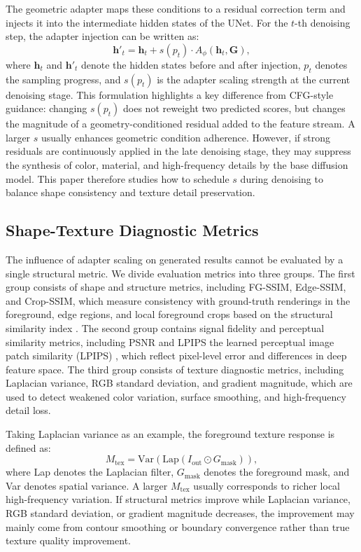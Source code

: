 \documentclass[times,twocolumn,final]{elsarticle}
\providecommand{\DIFadd}[1]{{\protect\color{blue} \sf #1}} %
\providecommand{\DIFdel}[1]{{\protect\color{red} \scriptsize #1}} %
\providecommand{\DIFaddbegin}{} %
\providecommand{\DIFaddend}{} %
\providecommand{\DIFdelbegin}{} %
\providecommand{\DIFdelend}{} %
\newcommand{\DIFscaledelfig}{0.5}
\newlength{\DIFdelgraphicswidth} %
\newlength{\DIFdelgraphicsheight} %
\newcommand{\DIFaddincludegraphics}[2][]{{\color{blue}\fbox{\DIFOincludegraphics[#1]{#2}}}} %
\newcommand{\DIFdelincludegraphics}[2][]{%
\sbox{\DIFdelgraphicsbox}{\DIFOincludegraphics[#1]{#2}}%
\settoboxwidth{\DIFdelgraphicswidth}{\DIFdelgraphicsbox} %
\settoboxtotalheight{\DIFdelgraphicsheight}{\DIFdelgraphicsbox} %
\scalebox{\DIFscaledelfig}{%
\parbox[b]{\DIFdelgraphicswidth}{\usebox{\DIFdelgraphicsbox}\\[-\baselineskip] \rule{\DIFdelgraphicswidth}{0em}}\llap{\resizebox{\DIFdelgraphicswidth}{\DIFdelgraphicsheight}{%
\setlength{\unitlength}{\DIFdelgraphicswidth}%
\begin{picture}(1,1)%
\thicklines\linethickness{2pt} %
{\color[rgb]{1,0,0}\put(0,0){\framebox(1,1){}}}%
{\color[rgb]{1,0,0}\put(0,0){\line( 1,1){1}}}%
{\color[rgb]{1,0,0}\put(0,1){\line(1,-1){1}}}%
\end{picture}%
}\hspace*{3pt}}} %
} %
\DeclareRobustCommand{\DIFaddbegin}{\DIFOaddbegin \let\includegraphics\DIFaddincludegraphics} %
\DeclareRobustCommand{\DIFaddend}{\DIFOaddend \let\includegraphics\DIFOincludegraphics} %
\DeclareRobustCommand{\DIFdelbegin}{\DIFOdelbegin \let\includegraphics\DIFdelincludegraphics} %
\DeclareRobustCommand{\DIFdelend}{\DIFOaddend \let\includegraphics\DIFOincludegraphics} %
\begin{document}
The geometric adapter maps these conditions to a residual correction term and injects it into the intermediate hidden states of the UNet. For the $t$-th denoising step, the adapter injection can be written as:
\begin{equation}
\mathbf{h}'_t = \mathbf{h}_t + s(p_t) \cdot A_\phi(\mathbf{h}_t, \mathbf{G}),
\label{eq:injection}
\end{equation}
where $\mathbf{h}_t$ and $\mathbf{h}'_t$ denote the hidden states before and after injection, $p_t$ denotes the sampling progress, and $s(p_t)$ is the adapter scaling strength at the current denoising stage. This formulation highlights a key difference from CFG-style guidance: changing $s(p_t)$ does not reweight two predicted scores, but changes the magnitude of a geometry-conditioned residual added to the feature stream. A larger $s$ usually enhances geometric condition adherence. However, if strong residuals are continuously applied in the late denoising stage, they may suppress the synthesis of color, material, and high-frequency details by the base diffusion model. This paper therefore studies how to schedule $s$ during denoising to balance shape consistency and texture detail preservation.

\subsection{Shape-Texture Diagnostic Metrics}
\label{subsec:metrics}

The influence of adapter scaling on generated results cannot be evaluated by a single structural metric. We divide evaluation metrics into three groups. The first group consists of shape and structure metrics, including FG-SSIM, Edge-SSIM, and Crop-SSIM, which measure consistency with ground-truth renderings in the foreground, edge regions, and local foreground crops \DIFaddbegin \DIFadd{based on the structural similarity index \cite{wang2004ssim}}\DIFaddend . The second group contains signal fidelity and perceptual similarity metrics, including PSNR and \DIFdelbegin \DIFdel{LPIPS}\DIFdelend \DIFaddbegin \DIFadd{the learned perceptual image patch similarity (LPIPS) \cite{zhang2018lpips}}\DIFaddend , which reflect pixel-level error and differences in deep feature space. The third group consists of texture diagnostic metrics, including Laplacian variance, RGB standard deviation, and gradient magnitude, which are used to detect weakened color variation, surface smoothing, and high-frequency detail loss.

Taking Laplacian variance as an example, the foreground texture response is defined as:
\begin{equation}
M_\text{tex} = \text{Var}(\text{Lap}(I_\text{out} \odot G_\text{mask})),
\end{equation}
where Lap denotes the Laplacian filter, $G_\text{mask}$ denotes the foreground mask, and Var denotes spatial variance. A larger $M_\text{tex}$ usually corresponds to richer local high-frequency variation. If structural metrics improve while Laplacian variance, RGB standard deviation, or gradient magnitude decreases, the improvement may mainly come from contour smoothing or boundary convergence rather than true texture quality improvement.
\end{document}
